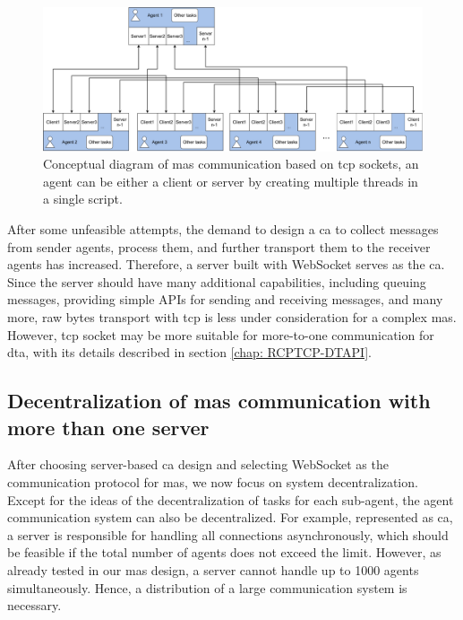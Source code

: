 \begin{figure}[htb]
    \centering
    \includegraphics[width=\textwidth]{figures/threads_MAS.pdf}

    \caption{Conceptual diagram of \gls{mas} communication based on 
    \gls{tcp} sockets, an agent can be either a client or server by creating 
    multiple threads in a single script. \label{fig: threadMASConceptual}}
\end{figure}



After some unfeasible attempts, the demand to design a \gls{ca} to collect 
messages from sender agents, process them, and further transport them to the 
receiver agents has increased. Therefore, a server built with WebSocket serves 
as the \gls{ca}. Since the server should have many additional 
capabilities, including queuing messages, providing simple APIs for sending 
and receiving messages, and many more, raw bytes transport with \gls{tcp} is 
less under consideration for a complex \gls{mas}. However, \gls{tcp} socket 
may be more suitable for more-to-one communication for \gls{dta}, 
with its details described in section \ref{chap: RCPTCP-DTAPI}.  



\subsection{Decentralization of \gls{mas} communication with more than one server}
After choosing server-based \gls{ca} design and selecting WebSocket as the 
communication protocol for \gls{mas}, we now focus on system decentralization.  
Except for the ideas of the decentralization of tasks for each sub-agent, the agent 
communication system can also be decentralized. For example, represented as \gls{ca}, 
a server is responsible for handling all connections asynchronously, which should be 
feasible if the total number of agents does not exceed the limit. However, as already 
tested in our \gls{mas} design, a server cannot handle up to 1000 agents simultaneously. 
Hence, a distribution of a large communication system is necessary. 



